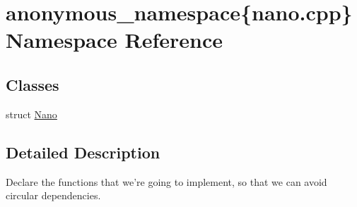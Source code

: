 \hypertarget{namespaceanonymous__namespace_02nano_8cpp_03}{\section{anonymous\-\_\-namespace\{nano.\-cpp\} Namespace Reference}
\label{namespaceanonymous__namespace_02nano_8cpp_03}
}
\subsection*{Classes}
\begin{DoxyCompactItemize}
\item 
struct \hyperlink{structanonymous__namespace_02nano_8cpp_03_1_1Nano}{Nano}
\end{DoxyCompactItemize}


\subsection{Detailed Description}
Declare the functions that we're going to implement, so that we can avoid circular dependencies. 